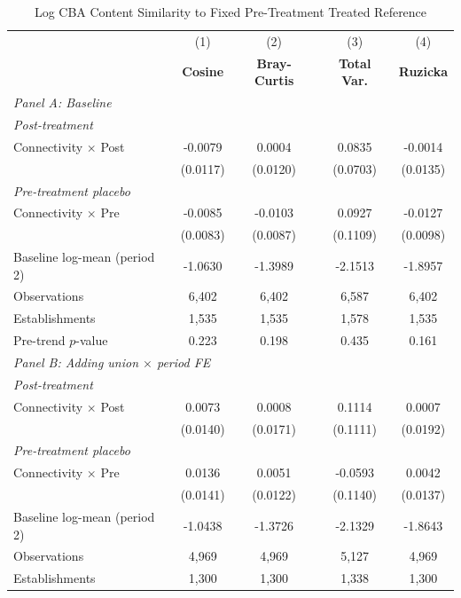 \begin{table}[H]
\centering
\caption{Log CBA Content Similarity to Fixed Pre-Treatment Treated Reference}
\label{tab:pretreat_ref_uncorr_w_ln_cba_similarity}
\scriptsize
\setlength{\tabcolsep}{8pt}
\begin{tabular}{lcccc}
\hline\hline
 & (1) & (2) & (3) & (4) \\
 & \textbf{Cosine} & \textbf{Bray-Curtis} & \textbf{Total Var.} & \textbf{Ruzicka} \\
\hline
\multicolumn{5}{l}{\textit{Panel A: Baseline}} \\
\multicolumn{5}{l}{\textit{Post-treatment}} \\
Connectivity $\times$ Post & -0.0079 & 0.0004 & 0.0835 & -0.0014 \\
 & (0.0117) & (0.0120) & (0.0703) & (0.0135) \\
\multicolumn{5}{l}{\textit{Pre-treatment placebo}} \\
Connectivity $\times$ Pre & -0.0085 & -0.0103 & 0.0927 & -0.0127 \\
 & (0.0083) & (0.0087) & (0.1109) & (0.0098) \\
\hline
Baseline log-mean (period 2) & -1.0630 & -1.3989 & -2.1513 & -1.8957 \\
Observations &        6,402 &        6,402 &        6,587 &        6,402 \\
Establishments &        1,535 &        1,535 &        1,578 &        1,535 \\
Pre-trend $p$-value & 0.223 & 0.198 & 0.435 & 0.161 \\
\hline
\multicolumn{5}{l}{\textit{Panel B: Adding union $\times$ period FE}} \\
\multicolumn{5}{l}{\textit{Post-treatment}} \\
Connectivity $\times$ Post & 0.0073 & 0.0008 & 0.1114 & 0.0007 \\
 & (0.0140) & (0.0171) & (0.1111) & (0.0192) \\
\multicolumn{5}{l}{\textit{Pre-treatment placebo}} \\
Connectivity $\times$ Pre & 0.0136 & 0.0051 & -0.0593 & 0.0042 \\
 & (0.0141) & (0.0122) & (0.1140) & (0.0137) \\
\hline
Baseline log-mean (period 2) & -1.0438 & -1.3726 & -2.1329 & -1.8643 \\
Observations &        4,969 &        4,969 &        5,127 &        4,969 \\
Establishments &        1,300 &        1,300 &        1,338 &        1,300 \\

\end{tabular}
\end{table}
